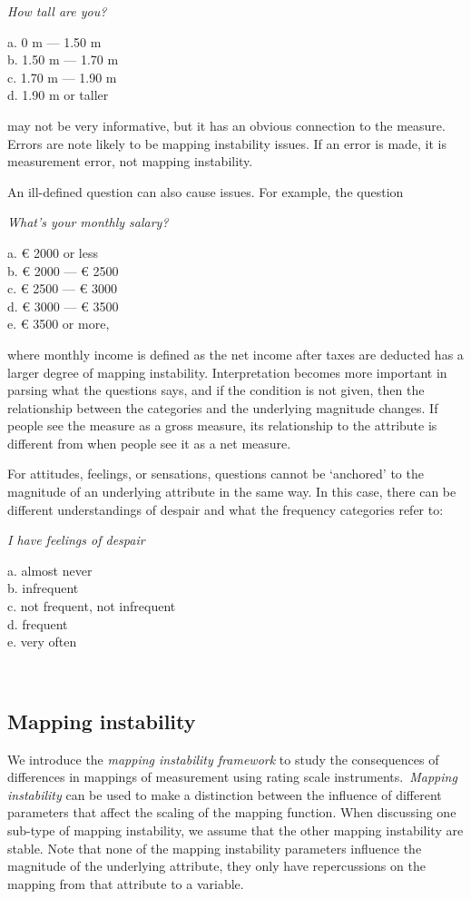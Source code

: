 \documentclass[titlepage, a4paper, 11pt]{article}
\begin{document}
\centerline{\textit{How tall are you?}}
\begin{center}
\parbox{3.5cm}{
a. 0 m --- 1.50 m\\
b. 1.50 m --- 1.70 m\\
c. 1.70 m --- 1.90 m\\
d. 1.90 m or taller}
\end{center}

may not be very informative, but it has an obvious connection to the measure. Errors are note likely to be mapping instability issues. If an error is made, it is measurement error, not mapping instability.

An ill-defined question can also cause issues. For example, the question

\centerline{\textit{What's your monthly salary?}}
\begin{center}
\parbox{3.5cm}{
a. € 2000 or less\\
b. € 2000 --- € 2500\\
c. € 2500 --- € 3000\\
d. € 3000 --- € 3500\\
e. € 3500 or more, }
\end{center}

where monthly income is defined as the net income after taxes are deducted has a larger degree of mapping instability. Interpretation becomes more important in parsing what the questions says, and if the condition is not given, then the relationship between the categories and the underlying magnitude changes. If people see the measure as a gross measure, its relationship to the attribute is different from when people see it as a net measure.

For attitudes, feelings, or sensations, questions cannot be `anchored' to the magnitude of an underlying attribute in the same way. In this case, there can be different understandings of despair and what the frequency categories refer to:
\newpage
\centerline{\textit{I have feelings of despair}}
\begin{center}
\parbox{5cm}{
a. almost never\\
b. infrequent\\
c. not frequent, not infrequent\\
d. frequent\\
e. very often}\\
\end{center}

\subsection{Mapping instability}
We introduce the \textit{mapping instability framework} to study the consequences of differences in mappings of measurement using rating scale instruments.\ \textit{Mapping instability} can be used to make a distinction between the influence of different parameters that affect the scaling of the mapping function. When discussing one sub-type of mapping instability, we assume that the other mapping instability are stable. Note that none of the mapping instability parameters influence the magnitude of the underlying attribute, they only have repercussions on the mapping from that attribute to a variable.
\end{document}
